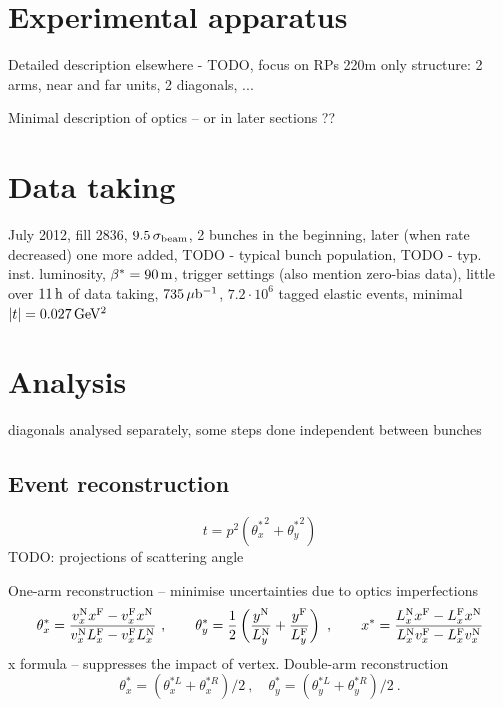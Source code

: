 \documentclass[TOTEM]{cern/cernphprep}
\def\un#1{\,{\rm #1}}
\def\hang{\hangindent=\parindent}
\def\>{\par\vskip\itskip\parindent\itindent\indent\hang\llap{\hbox to3mm{$\bullet$\hss}}}
\def\>E{\par\vskip\itskip\parindent\itindent\indent\hang\llap{\hbox to3mm{\hss}}}
\def\>>{\par\vskip\iitskip\parindent\iitindent\indent\hang\llap{\hbox to\iitindent{\hss--\ }}}
\begin{document}
\section{Experimental apparatus}

Detailed description elsewhere \cite{totem-jinst} - TODO, focus on RPs 220m only
\> structure: 2 arms, near and far units, 2 diagonals, ...

\> Minimal description of optics -- or in later sections ??

\section{Data taking}

July 2012,
fill 2836,
$9.5\,\sigma_{\rm beam}$,
2 bunches in the beginning, later (when rate decreased) one more added,
TODO - typical bunch population,
TODO - typ. inst. luminosity,
$\beta^* = 90\un{m}$,
trigger settings (also mention zero-bias data),
little over $11\un{h}$ of data taking,
$735\un{\mu b^{-1}}$,
$7.2\cdot 10^6$ tagged elastic events,
minimal $|t| = 0.027\un{GeV^2}$ %


\section{Analysis}

\> diagonals analysed separately, some steps done independent between bunches


\subsection{Event reconstruction}

\begin{equation}
\label{eq:t}
t = p^2 ({\theta_x^*}^2 + {\theta_y^*}^2)
\end{equation}
TODO: projections of scattering angle

One-arm reconstruction -- minimise uncertainties due to optics imperfections
\begin{equation}
\label{eq:kin 1a}
\theta_x^* = {v_x^{\rm N} x^{\rm F} - v_x^{\rm F} x^{\rm N}\over v_x^{\rm N} L_x^{\rm F} - v_x^{\rm F} L_x^{\rm N}}\ ,\qquad
\theta_y^* = {1\over 2} \left( {y^{\rm N}\over L_y^{\rm N}} + {y^{\rm F}\over L_y^{\rm F}} \right)\ ,\qquad
x^* = {L_x^{\rm N} x^{\rm F} - L_x^{\rm F} x^{\rm N}\over L_x^{\rm N} v_x^{\rm F} - L_x^{\rm F} v_x^{\rm N}}
\end{equation}
x formula -- suppresses the impact of vertex.
Double-arm reconstruction
\begin{equation}
\label{eq:kin 2a}
\theta_x^* = (\theta_x^{*L} + \theta_x^{*R})/2\ ,\quad \theta_y^* = (\theta_y^{*L} + \theta_y^{*R})/2\ .
\end{equation}
\end{document}
